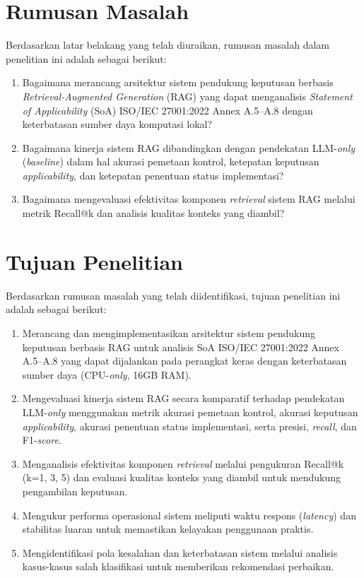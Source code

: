 \documentclass[bachelor,bahasa]{thesisdtetiugm}
\begin{document}
\section{Rumusan Masalah}
\label{sec:rumusan-masalah}

Berdasarkan latar belakang yang telah diuraikan, rumusan masalah dalam penelitian ini adalah sebagai berikut:

\begin{enumerate}
	\item Bagaimana merancang arsitektur sistem pendukung keputusan berbasis \textit{Retrieval-Augmented Generation} (RAG) yang dapat menganalisis \textit{Statement of Applicability} (SoA) ISO/IEC 27001:2022 Annex A.5--A.8 dengan keterbatasan sumber daya komputasi lokal?
	
	\item Bagaimana kinerja sistem RAG dibandingkan dengan pendekatan LLM-\textit{only} (\textit{baseline}) dalam hal akurasi pemetaan kontrol, ketepatan keputusan \textit{applicability}, dan ketepatan penentuan status implementasi?
	
	\item Bagaimana mengevaluasi efektivitas komponen \textit{retrieval} sistem RAG melalui metrik Recall@k dan analisis kualitas konteks yang diambil?
\end{enumerate}

\section{Tujuan Penelitian}
\label{sec:tujuan-penelitian}

Berdasarkan rumusan masalah yang telah diidentifikasi, tujuan penelitian ini adalah sebagai berikut:

\begin{enumerate}
	\item Merancang dan mengimplementasikan arsitektur sistem pendukung keputusan berbasis RAG untuk analisis SoA ISO/IEC 27001:2022 Annex A.5--A.8 yang dapat dijalankan pada perangkat keras dengan keterbatasan sumber daya (CPU-\textit{only}, 16GB RAM).
	
	\item Mengevaluasi kinerja sistem RAG secara komparatif terhadap pendekatan LLM-\textit{only} menggunakan metrik akurasi pemetaan kontrol, akurasi keputusan \textit{applicability}, akurasi penentuan status implementasi, serta presisi, \textit{recall}, dan F1-\textit{score}.
	
	\item Menganalisis efektivitas komponen \textit{retrieval} melalui pengukuran Recall@k (k=1, 3, 5) dan evaluasi kualitas konteks yang diambil untuk mendukung pengambilan keputusan.
	
	\item Mengukur performa operasional sistem meliputi waktu respons (\textit{latency}) dan stabilitas luaran untuk memastikan kelayakan penggunaan praktis.
	
	\item Mengidentifikasi pola kesalahan dan keterbatasan sistem melalui analisis kasus-kasus salah klasifikasi untuk memberikan rekomendasi perbaikan.
\end{enumerate}
\end{document}
